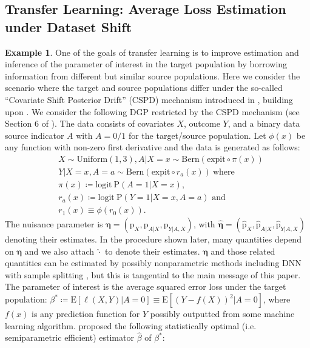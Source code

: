 \documentclass{article}
\def\logit{\mathrm{logit}}
\def\expit{\mathrm{expit}}
\theoremstyle{plain}
\theoremstyle{definition}
\newtheorem{example}[theorem]{Example}
\theoremstyle{remark}
\def\P{\mathrm{P}}
\def\E{\mathrm{E}}
\def\hat{\widehat}
\def\p{\mathrm{p}}
\begin{document}
\subsection{Transfer Learning: Average Loss Estimation under Dataset Shift}
\begin{example}
One of the goals of transfer learning \citep{zhang2020domain, gong2016domain, scott2019generalized, li2023subspace} is to improve estimation and inference of the parameter of interest in the target population by borrowing information from different but similar source populations. Here we consider the scenario where the target and source populations differ under the so-called ``Covariate Shift Posterior Drift'' (CSPD) mechanism introduced in \citet{qiu2023efficient}, building upon \citet{scott2019generalized}. We consider the following DGP restricted by the CSPD mechanism (see Section 6 of \citet{qiu2023efficient}). The data consists of covariates $X$, outcome $Y$, and a binary data source indicator $A$ with $A = 0/1$ for the target/source population. Let $\phi (x)$ be any function with non-zero first derivative and the data is generated as follows:
\begin{equation}
\begin{aligned}
\label{model_data_shift}
& X \sim \text{Uniform}(1,3), A | X = x \sim \text{Bern} (\expit \circ \pi (x)) \\
& Y | X = x, A = a \sim \text{Bern} \left( \expit \circ r_{a} (x) \right) \ \text{where } \\
& \pi (x) \coloneqq \logit \ \P (A = 1 | X = x), \\
& r_{a} (x) \coloneqq \logit \ \P (Y = 1 | X = x, A = a)\text{ and }\\
&  r_{1} (x) \equiv \phi \left( r_{0} (x) \right).
\end{aligned}
\end{equation}
The nuisance parameter is $\bm{\eta} = (\p_X, \p_{A|X},\p_{Y|A,X})$, with $\hat{\bm{\eta}} = (\hat{\p}_X,\hat{\p}_{A|X},\hat{\p}_{Y|A,X})$ denoting their estimates. In the procedure shown later, many quantities depend on $\bm{\eta}$ and we also attach $\hat{\cdot}$ to denote their estimates. $\bm{\eta}$ and those related quantities can be estimated by possibly nonparametric methods including DNN \citep{farrell2021deep, xu2022deepmed, chen2024causal} with sample splitting \citep{chernozhukov2018double}, but this is tangential to the main message of this paper. The parameter of interest is the average squared error loss under the target population: $\beta^{\ast} \coloneqq \E [\ell(X,Y) | A = 0] \equiv \E [(Y - f(X))^2 | A = 0]$, where $f (x)$ is any prediction function for $Y$ possibly outputted from some machine learning algorithm. \citet{qiu2023efficient} proposed the following statistically optimal (i.e. semiparametric efficient) estimator $\hat{\beta}$ of $\beta^{\ast}$:

\end{example}
\end{document}
